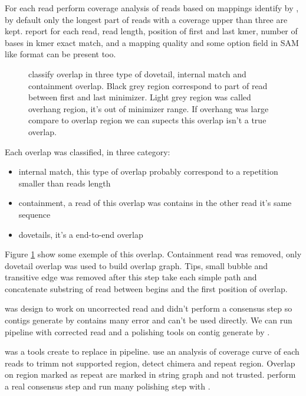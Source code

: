 \documentclass[main]{subfiles}
\begin{document}
For each read \miniasm perform coverage analysis of reads based on mappings identify by \minimap, by default only the longest part of reads with a coverage upper than three are kept. \minimap report for each read, read length, position of first and last kmer, number of bases in kmer exact match,  and a mapping quality and some option field in SAM like format can be present too.

\begin{figure}[ht]
    \centering
    
    \caption{\miniasm classify overlap in three type of dovetail, internal match and containment overlap. Black grey region correspond to part of read between first and last minimizer. Light grey region was called overhang region, it's out of minimizer range. If overhang was large compare to overlap region we can supects this overlap isn't a true overlap.}
    \label{sota:fig:miniasm:ovl_classification}
\end{figure}

Each overlap was classified, in three category:
\begin{itemize}
    \item internal match, this type of overlap probably correspond to a repetition smaller than reads length
    \item containment, a read of this overlap was contains in the other read it's same sequence
    \item dovetails, it's a end-to-end overlap
\end{itemize}
Figure \ref{sota:fig:miniasm:ovl_classification} show some exemple of this overlap. Containment read was removed, only dovetail overlap was used to build overlap graph. Tips, small bubble and transitive edge was removed after this step \miniasm take each simple path and concatenate substring of read between begins and the first position of overlap.

\miniasm was design to work on uncorrected read and didn't perform a consensus step so contigs generate by \miniasm contains many error and can't be used directly. We can run \minimap \miniasm pipeline with corrected read and a polishing tools on contig generate by \miniasm. 

\cite{Ra} was a tools create to replace \miniasm in \minimap \miniasm pipeline.  use an analysis of coverage curve of each reads to trimm not supported region, detect chimera and repeat region. Overlap on region marked as repeat are marked in string graph and not trusted.  perform a real consensus step and run many polishing step with . 
\end{document}
